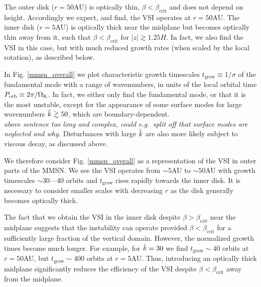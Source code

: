 The outer disk ($r=50$AU) is optically thin,
$\beta<\beta_\mathrm{crit}$  and  does not depend on height.
Accordingly we expect, and find, the VSI operates at $r=50$AU. The
inner disk ($r=5$AU) is optically thick near the midplane but becomes
optically thin away from it, such that $\beta < \beta_\mathrm{crit}$
for $|z|\gtrsim1.25H$. In fact, we also find the VSI in this case, but
with much reduced growth rates (when scaled by the local rotation), as
described below.     

In Fig. \ref{mmsn_overall} we plot characteristic growth timescales
$t_\mathrm{grow} \equiv 1/\sigma$ of the fundamental mode with a range of
wavenumbers, in units of the local orbital time $P_\mathrm{orb}\equiv
2\pi/\Omega_{\rm K}$. In fact, we either only find the fundamental mode, or 
that it is the most unstable, except for the appearance of some 
surface modes for large wavenumbers $\hat{k}\gtrsim 50$, which are 
boundary-dependent.  \\
\emph{above sentence too long and complex, could e.g.\ split off that surface modes are neglected and why.}
Disturbances with large $\hat{k}$ are also more likely subject to viscous 
decay, as discussed above. 



We therefore consider Fig. \ref{mmsn_overall} as a representation of the
VSI in outer parts of the MMSN. We see the VSI operates from $\sim 5$AU to $\sim
50$AU with growth timescales $\sim 30$---40 orbits and
$t_\mathrm{grow}$ rises rapidly towards the inner disk. It is
necessary to consider smaller scales with decreasing $r$ as the disk
generally becomes optically thick.  

The fact that we obtain the VSI in the inner disk despite $\beta >
\beta_\mathrm{crit}$ near the midplane suggests that the instability
can operate provided $\beta < \beta_\mathrm{crit}$ for a sufficiently large
fraction of the vertical domain. However, the normalized growth times
become much longer. For example, for $\hat{k}=30$ we find
$t_\mathrm{grow}\sim 40$ orbits at $r=50$AU, but $t_\mathrm{grow}\sim
400$ orbits at $r=5$AU. Thus, introducing an optically thick midplane
significantly reduces the efficiency of the VSI despite $\beta <
\beta_\mathrm{crit}$ away from the midplane. 

